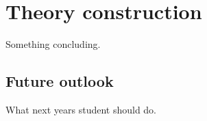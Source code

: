 \chapter{Theory construction\label{cha:theory}}

Something concluding.

\section{Future outlook}

What next years student should do.